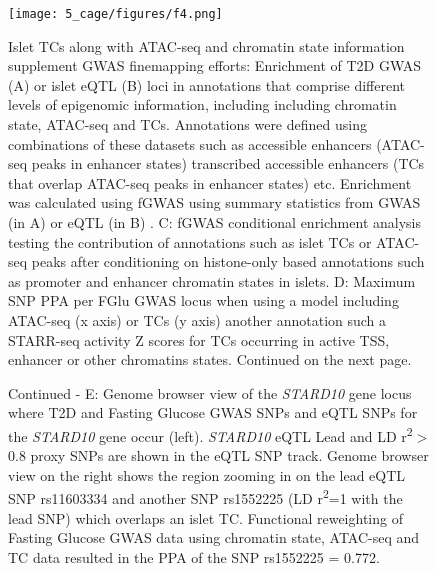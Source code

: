 \begin{figure}
            \centering
            \texttt{[image: 5\_cage/figures/f4.png]}
            \caption[Islet TCs along with ATAC-seq and chromatin state information supplement GWAS finemapping efforts]{Islet TCs along with ATAC-seq and chromatin state information supplement GWAS finemapping efforts: Enrichment of T2D GWAS (A) or islet eQTL (B) loci in annotations that comprise different levels of epigenomic information, including including chromatin state, ATAC-seq and TCs. Annotations were defined using combinations of these datasets such as accessible enhancers (ATAC-seq peaks in enhancer states) transcribed accessible enhancers (TCs that overlap ATAC-seq peaks in enhancer states) etc. Enrichment was calculated using fGWAS \cite{pickrellJointAnalysisFunctional2014} using summary statistics from GWAS (in A) \cite{mahajanFinemappingTypeDiabetes2018} or eQTL (in B) \cite{varshneyGeneticRegulatorySignatures2017}. C: fGWAS conditional enrichment analysis testing the contribution of annotations such as islet TCs or ATAC-seq peaks after conditioning on histone-only based annotations such as promoter and enhancer chromatin states in islets. D: Maximum SNP PPA per FGlu GWAS locus when using a model including ATAC-seq (x axis) or TCs (y axis)  another annotation such a STARR-seq activity Z scores for TCs occurring in active TSS, enhancer or other chromatins states. Continued on the next page.}
            \label{fig:c5_f4}
\end{figure}


\addtocounter{figure}{-1}
\begin{figure} [t!]
  \caption[Figure \ref{fig:c5_f4} continued]{Continued - E: Genome browser view of the \textit{STARD10} gene locus where T2D and Fasting Glucose GWAS SNPs and eQTL SNPs for the \textit{STARD10} gene occur (left). \textit{STARD10} eQTL Lead and LD r\textsuperscript{2}$>$0.8 proxy SNPs are shown in the eQTL SNP track. Genome browser view on the right shows the region zooming in on the lead eQTL SNP rs11603334 and another SNP rs1552225 (LD  r\textsuperscript{2}=1 with the lead SNP) which overlaps an islet TC. Functional reweighting of Fasting Glucose GWAS data using chromatin state, ATAC-seq and TC data resulted in the PPA of the SNP rs1552225 = 0.772.}
\end{figure}


